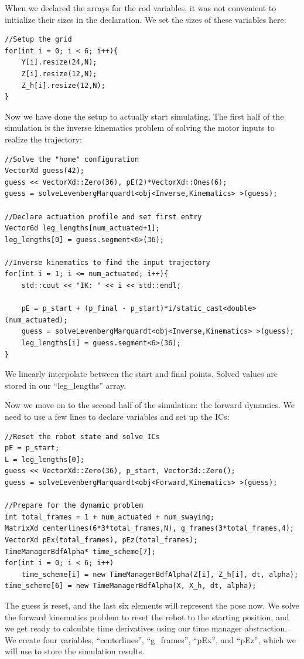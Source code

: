 \documentclass[12pt]{article}
\begin{document}
When we declared the arrays for the rod variables, it was not convenient to initialize their sizes in the declaration. We set the sizes of these variables here:
\begin{lstlisting}
//Setup the grid
for(int i = 0; i < 6; i++){
    Y[i].resize(24,N);
    Z[i].resize(12,N);
    Z_h[i].resize(12,N);
}
\end{lstlisting}
Now we have done the setup to actually start simulating. The first half of the simulation is the inverse kinematics problem of solving the motor inputs to realize the trajectory:
\begin{lstlisting}
//Solve the "home" configuration
VectorXd guess(42);
guess << VectorXd::Zero(36), pE(2)*VectorXd::Ones(6);
guess = solveLevenbergMarquardt<obj<Inverse,Kinematics> >(guess);

//Declare actuation profile and set first entry
Vector6d leg_lengths[num_actuated+1];
leg_lengths[0] = guess.segment<6>(36);

//Inverse kinematics to find the input trajectory
for(int i = 1; i <= num_actuated; i++){
    std::cout << "IK: " << i << std::endl;

    pE = p_start + (p_final - p_start)*i/static_cast<double>(num_actuated);
    guess = solveLevenbergMarquardt<obj<Inverse,Kinematics> >(guess);
    leg_lengths[i] = guess.segment<6>(36);
}
\end{lstlisting}
We linearly interpolate between the start and final points. Solved values are stored in our ``leg\_lengths'' array.

\newpage \noindent
Now we move on to the second half of the simulation: the forward dynamics. We need to use a few lines to declare variables and set up the ICs:
\begin{lstlisting}
//Reset the robot state and solve ICs
pE = p_start;
L = leg_lengths[0];
guess << VectorXd::Zero(36), p_start, Vector3d::Zero();
guess = solveLevenbergMarquardt<obj<Forward,Kinematics> >(guess);

//Prepare for the dynamic problem
int total_frames = 1 + num_actuated + num_swaying;
MatrixXd centerlines(6*3*total_frames,N), g_frames(3*total_frames,4);
VectorXd pEx(total_frames), pEz(total_frames);
TimeManagerBdfAlpha* time_scheme[7];
for(int i = 0; i < 6; i++)
    time_scheme[i] = new TimeManagerBdfAlpha(Z[i], Z_h[i], dt, alpha);
time_scheme[6] = new TimeManagerBdfAlpha(X, X_h, dt, alpha);
\end{lstlisting}
The guess is reset, and the last six elements will represent the pose now. We solve the forward kinematics problem to reset the robot to the starting position, and we get ready to calculate time derivatives using our time manager abstraction. We create four variables, ``centerlines'', ``g\_frames'', ``pEx'', and ``pEz'', which we will use to store the simulation results.
\end{document}
